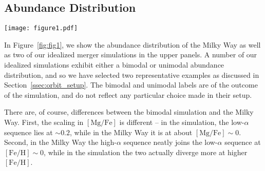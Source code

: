 \documentclass[twocolumn,linenumbers,trackchanges]{aastex631}
\newcommand{\kms}{\ensuremath{\textrm{km}/\textrm{s}}}
\newcommand{\FeH}{\ensuremath{[\textrm{Fe}/\textrm{H}]}}
\newcommand{\MgFe}{\ensuremath{[\textrm{Mg}/\textrm{Fe}]}}
\newcommand{\dex}{\ensuremath{\textrm{dex}}}
\begin{document}
\subsection{Abundance Distribution}\label{ssec:abundplane}
\begin{figure*}
  \centering
  \texttt{[image: figure1.pdf]}
  \caption{The abundance bimodality seen in the Milky Way can be reproduced in some idealized merger simulations. In the upper panels, we show the distribution of stars in the \MgFe{}-\FeH{} plane. The lower panels show the distribution of \MgFe{} at a fixed \FeH{} bin of width $0.05\,\dex$. The colors indicate the fixed \FeH values, which are $-0.5$, $-0.25$, $0$, and $0.25$. The left column shows the observed distribution in the Milky Way from ASPCAP DR17 \citep[][J.A.~Holtzman et al., in preparation]{2016AJ....151..144G}, while the right two columns show two idealized merger simulations. The idealized merger simulations are nearly identical, except that in the bimodal simulation the satellite has a starting velocity of $142\,\kms$, while in the unimodal simulation it has a starting velocity of $116\,\kms$. The labels ``unimodal'' and ``bimodal'' are of the \textit{outcome} of the simulation, and do not reflect a particular choice in the setup. The Milky Way (left column) exhibits a strong bimodal distribution of \MgFe{} at various \FeH{}. The idealized merger simulation marked as bimodal (center column) also exhibits a bimodal distribution of \MgFe{}, though the structure is not as strongly defined. The idealized merger simulation marked as unimodal (right column) exhibits only weak structure, if any at all.}
  \label{fig:fig1}
\end{figure*}

In Figure~\ref{fig:fig1}, we show the abundance distribution of the Milky Way as well as two of our idealized merger simulations in the upper panels. A number of our idealized simulations exhibit either a bimodal or unimodal abundance distribution, and so we have selected two representative examples as discussed in Section~\ref{ssec:orbit_setup}. The bimodal and unimodal labels are of the outcome of the simulation, and do not reflect any particular choice made in their setup.

There are, of course, differences between the bimodal simulation and the Milky Way. First, the scaling in \MgFe{} is different -- in the simulation, the low-$\alpha$ sequence lies at $\sim0.2$, while in the Milky Way it is at about $\MgFe\sim0$. Second, in the Milky Way the high-$\alpha$ sequence neatly joins the low-$\alpha$ sequence at $\FeH\sim0$, while in the simulation the two actually diverge more at higher \FeH{}.
\end{document}

